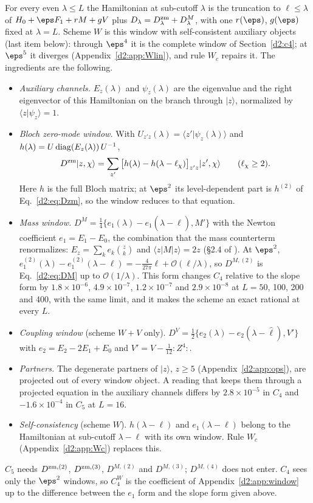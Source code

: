 For every even $\lambda\le L$ the Hamiltonian at sub-cutoff $\lambda$ is the truncation to $\ell\le\lambda$ of
$H_0+\eps F_1+rM+gV$ plus $D_\lambda=D^{\rm zm}_\lambda+D^M_\lambda$, with one $r(\eps)$, $g(\eps)$ fixed at $\lambda=L$. Scheme $W$ is
this window with self-consistent auxiliary objects (last item below): through $\eps^4$ it is the complete window of
Section~\ref{d2:c4}; at $\eps^5$ it diverges (Appendix~\ref{d2:app:Wlin}), and rule $W_c$ repairs it. The ingredients are the
following.
\begin{itemize}
\item \emph{Auxiliary channels.} $E_z(\lambda)$ and $\psi_z(\lambda)$ are the eigenvalue and the right eigenvector of this
 Hamiltonian on the branch through $|z\rangle$, normalized by $\langle z|\psi_z\rangle=1$.
\item \emph{Bloch zero-mode window.} With $U_{z'z}(\lambda)=\langle z'|\psi_z(\lambda)\rangle$ and
 $h(\lambda)=U\,{\rm diag}(E_z(\lambda))\,U^{-1}$,
 \[
  D^{\rm zm}|z,\chi\rangle=\sum_{z'}\big[h(\lambda)-h(\lambda-\ell_\chi)\big]_{z'z}|z',\chi\rangle\qquad(\ell_\chi\ge2).
 \]
 Here $h$ is the full Bloch matrix; at $\eps^2$ its level-dependent part is $h^{(2)}$ of Eq.~\eqref{d2:eq:Dzm}, so the
 window reduces to that equation.
\item \emph{Mass window.} $D^M=\frac14\{e_1(\lambda)-e_1(\lambda-\hat\ell),M'\}$ with the Newton coefficient
 $e_1=E_1-E_0$, the combination that the mass counterterm renormalizes: $E_z=\sum_ke_k\binom zk$ and
 $\langle z|M|z\rangle=2z$ (\S2.4 of ). At $\eps^2$, $e_1^{(2)}(\lambda)-e_1^{(2)}(\lambda-\ell)=-\frac4{27\pi}\ell+\mathcal O(\ell/\lambda)$, so
 $D^{M,(2)}$ is Eq.~\eqref{d2:eq:DM} up to $\mathcal O(1/\lambda)$. This form changes $C_4$ relative to the slope form by
 $1.8\times10^{-6}$, $4.9\times10^{-7}$, $1.2\times10^{-7}$ and $2.9\times10^{-8}$ at $L=50$, 100, 200 and 400, with the same
 limit, and it makes the scheme an exact rational at every $L$.
\item \emph{Coupling window} (scheme $W{+}V$ only). $D^V=\frac12\{e_2(\lambda)-e_2(\lambda-\hat\ell),V'\}$ with
 $e_2=E_2-2E_1+E_0$ and $V'=V-\frac1{12}{:}Z^4{:}$.
\item \emph{Partners.} The degenerate partners of $|z\rangle$, $z\ge5$ (Appendix~\ref{d2:app:ops}), are projected out of every
 window object. A reading that keeps them through a projected equation in the auxiliary channels differs by
 $2.8\times10^{-5}$ in $C_4$ and $-1.6\times10^{-4}$ in $C_5$ at $L=16$.
\item \emph{Self-consistency} (scheme $W$). $h(\lambda-\ell)$ and $e_1(\lambda-\ell)$ belong to the Hamiltonian at
 sub-cutoff $\lambda-\ell$ with its own window. Rule $W_c$ (Appendix~\ref{d2:app:Wc}) replaces this.
\end{itemize}
$C_5$ needs $D^{{\rm zm},(2)}$, $D^{{\rm zm},(3)}$, $D^{M,(2)}$ and $D^{M,(3)}$; $D^{M,(4)}$ does not enter. $C_4$ sees only the
$\eps^2$ windows, so $C_4^W$ is the coefficient of Appendix~\ref{d2:app:window} up to the difference between the $e_1$ form
and the slope form given above.

